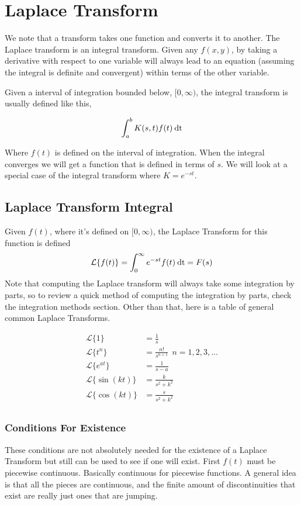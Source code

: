 \chapter{Laplace Transform}
We note that a transform takes one function and converts it to another. The Laplace transform is an integral transform. Given any $f(x,y)$, by taking a derivative with respect to one variable will always lead to an equation (assuming the integral is definite and convergent) within terms of the other variable. 

Given a interval of integration bounded below, $[0, \infty)$, the integral transform is usually defined like this, 

\begin{equation*}
	\int_a^b K(s,t)f(t) \:\mathrm{dt} 
\end{equation*}

Where $f(t)$ is defined on the interval of integration. When the integral converges we will get a function that is defined in terms of $s$. We will look at a special case of the integral transform where $K = e^{-st}$. 

\section{Laplace Transform Integral}
Given $f(t)$, where it's defined on $[0,\infty)$, the Laplace Transform for this function is defined
\begin{equation*}
	\mathcal{L} \{ f(t) \} = \int_0^\infty e^{-st} f(t) \:\mathrm{dt} = F(s)
\end{equation*}
Note that computing the Laplace transform will always take some integration by parts, so to review a quick method of computing the integration by parts, check the integration methods section. Other than that, here is a table of general common Laplace Transforms.

\begin{align*}
	\mathcal{L} \{ 1 \} &= \frac{1}{s} \\
	\mathcal{L} \{ t^n \} &= \frac{n!}{s^{n+1}} \:\: n=1,2,3,...\\
	\mathcal{L} \{ e^{at} \} &= \frac{1}{s-a} \\
	\mathcal{L} \{ \sin(kt) \} &= \frac{k}{s^2+k^2} \\
	\mathcal{L} \{ \cos(kt) \} &= \frac{s}{s^2+k^2} \\
\end{align*}

\subsection{Conditions For Existence}
These conditions are not absolutely needed for the existence of a Laplace Transform but still can be used to see if one will exist. First $f(t)$ must be piecewise continuous. Basically continuous for piecewise functions. A general idea is that all the pieces are continuous, and the finite amount of discontinuities that exist are really just ones that are jumping. 

